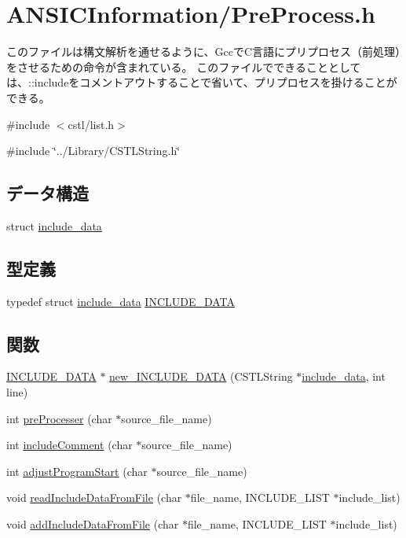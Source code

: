 \section{ANSICInformation/PreProcess.h}
\label{PreProcess_8h}


このファイルは構文解析を通せるように、GccでC言語にプリプロセス（前処理）をさせるための命令が含まれている。 このファイルでできることとしては、::includeをコメントアウトすることで省いて、プリプロセスを掛けることができる。  


{\ttfamily \#include $<$cstl/list.h$>$}\par
{\ttfamily \#include \char`\"{}../Library/CSTLString.h\char`\"{}}\par
\subsection*{データ構造}
\begin{DoxyCompactItemize}
\item 
struct \hyperlink{structinclude__data}{include\_\-data}
\end{DoxyCompactItemize}
\subsection*{型定義}
\begin{DoxyCompactItemize}
\item 
typedef struct \hyperlink{structinclude__data}{include\_\-data} \hyperlink{PreProcess_8h_a6d1a2dd96f6fa562d010b81ac0b69b21}{INCLUDE\_\-DATA}
\end{DoxyCompactItemize}
\subsection*{関数}
\begin{DoxyCompactItemize}
\item 
\hyperlink{structinclude__data}{INCLUDE\_\-DATA} $\ast$ \hyperlink{PreProcess_8h_a374f2859fbe8b968002a64b7ddedb676}{new\_\-INCLUDE\_\-DATA} (CSTLString $\ast$\hyperlink{structinclude__data}{include\_\-data}, int line)
\item 
int \hyperlink{PreProcess_8h_a3af15f622d39d61db338a5b2e0c659b8}{preProcesser} (char $\ast$source\_\-file\_\-name)
\item 
int \hyperlink{PreProcess_8h_a8f4e9a441c1ba8c61a31f1d9fa70f7a2}{includeComment} (char $\ast$source\_\-file\_\-name)
\item 
int \hyperlink{PreProcess_8h_a09e6288734c2015b2a7ec902afe34857}{adjustProgramStart} (char $\ast$source\_\-file\_\-name)
\item 
void \hyperlink{PreProcess_8h_a00b38a511fb2d9388ca76b7782890673}{readIncludeDataFromFile} (char $\ast$file\_\-name, INCLUDE\_\-LIST $\ast$include\_\-list)
\item 
void \hyperlink{PreProcess_8h_ad7bd5ce64ec94dac854c4633c099b379}{addIncludeDataFromFile} (char $\ast$file\_\-name, INCLUDE\_\-LIST $\ast$include\_\-list)
\end{DoxyCompactItemize}


